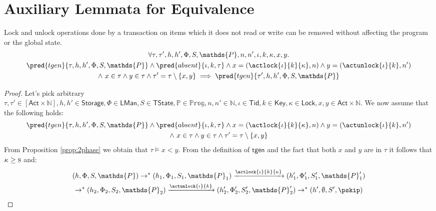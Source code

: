 \section{Auxiliary Lemmata for Equivalence}

\begin{lem}
	\label{lem:lockAbsent}
	Lock and unlock operations done by a transaction on items which it does not read or write can be removed without affecting the program or the global state.
	\begin{gather*}
		\forall \tau, \tau', h, h', \Phi, S, \mathds{P}, n, n', \iota, k, \kappa, x, y \ldotp
			\\
		\pred{tgen}{\tau, h, h', \Phi, S, \mathds{P}} \land  \pred{absent}{\iota, k, \tau} \land x = (\actlock{\iota}{k}{\kappa}, n) \land y = (\actunlock{\iota}{k}, n') \\ \land\ x \in \tau \land y \in \tau
		\land \tau' = \tau \setminus \{ x, y \}
			\implies
		\pred{tgen}{\tau', h, h', \Phi, S, \mathds{P}}
	\end{gather*}
	\begin{proof}
	Let's pick arbitrary $\tau, \tau' \in [\mathsf{Act} \times \mathds{N}], h, h' \in \mathsf{Storage}, \Phi \in \mathsf{LMan}, S \in \mathsf{TState}, \mathds{P} \in \mathds{Prog}, n, n' \in \mathds{N}, \iota \in \mathsf{Tid}, k \in \mathsf{Key}, \kappa \in \mathsf{Lock}, x, y \in \mathsf{Act} \times \mathds{N}$. We now assume that the following holds:
	\begin{gather*}
		\pred{tgen}{\tau, h, h', \Phi, S, \mathds{P}} \land  \pred{absent}{\iota, k, \tau} \land x = (\actlock{\iota}{k}{\kappa}, n) \land y = (\actunlock{\iota}{k}, n') \\ \land\ x \in \tau \land y \in \tau
		\land \tau' = \tau \setminus \{ x, y \}
	\end{gather*}
	From Proposition \ref{prop:2phase} we obtain that $\tau \vDash x < y$. From the definition of $\mathsf{tgen}$ and the fact that both $x$ and $y$ are in $\tau$ it follows that $\kappa \geq \textsc{s}$ and:
	\begin{gather}
		(h, \Phi, S, \mathds{P}) \rightarrow^* (h_1, \Phi_1, S_1, \mathds{P}_1) \xrightarrow{\actlock{\iota}{k}{\kappa}} (h_1', \Phi_1', S_1', \mathds{P}_1') \\ \rightarrow^* (h_2, \Phi_2, S_2, \mathds{P}_2) \xrightarrow{\actunlock{\iota}{k}} (h_2', \Phi_2', S_2', \mathds{P}_2') \rightarrow^* (h', \emptyset, S', \pskip)
	\end{gather}

\end{proof}
\end{lem}
